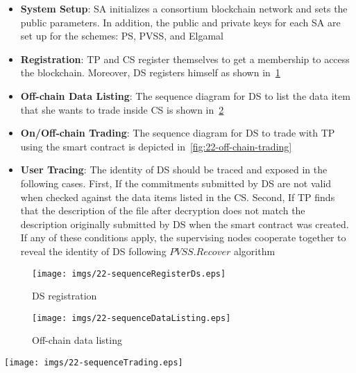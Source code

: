 \begin{itemize}
    \item \textbf{System Setup}: SA initializes a consortium blockchain network and sets the public parameters. In addition, the public and private keys for each SA are set up for the schemes: PS, PVSS, and Elgamal
    \item \textbf{Registration}: TP and CS register themselves to get a membership to access the blockchain.
    Moreover, DS registers himself as shown in~\cref{fig:22-ds-registration}
    \item \textbf{Off-chain Data Listing}: The sequence diagram for DS to list the data item that she wants to trade inside CS is shown in~\cref{fig:22-off-chain-data-listing}
    \item \textbf{On/Off-chain Trading}: The sequence diagram for DS to trade with TP using the smart contract is depicted in~\cref{fig:22-off-chain-trading}
    \item \textbf{User Tracing}: The identity of DS should be traced and exposed in the following cases.
    First, If the commitments submitted by DS are not valid when checked against the data items listed in the CS.
    Second, If TP finds that the description of the file after decryption does not match the description originally submitted by DS when the smart contract was created.
    If any of these conditions apply, the supervising nodes cooperate together to reveal the identity of DS following $PVSS.Recover$ algorithm
\end{itemize}

\begin{figure}
\centering
  \texttt{[image: imgs/22-sequenceRegisterDs.eps]}
  \caption{DS registration}
  \label{fig:22-ds-registration}
\end{figure}

\begin{figure}
\centering
  \texttt{[image: imgs/22-sequenceDataListing.eps]}
  \caption{Off-chain data listing}
  \label{fig:22-off-chain-data-listing}
\end{figure}

\begin{figure*}
\centering
  \texttt{[image: imgs/22-sequenceTrading.eps]}
  \caption{On/Off-chain trading}
  \label{fig:22-off-chain-trading}
\end{figure*}

